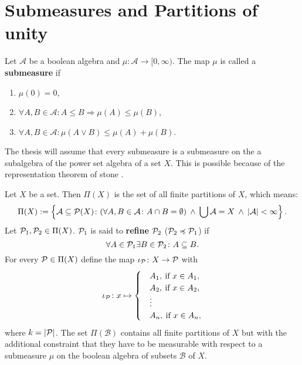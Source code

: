 \section{Submeasures and Partitions of unity}\label{appendixA}

\begin{defin}
  Let $\mathcal{A}$ be a boolean algebra and $\mu\colon \mathcal{A} \to [0, \infty)$. The map $\mu$ is called a \textbf{submeasure} if
  \begin{enumerate}
    \item $\mu(0) = 0$,
    \item $\forall A, B \in \mathcal{A}\colon A \leq B \Rightarrow \mu(A) \leq \mu(B)$,
    \item $\forall A, B \in \mathcal{A}\colon \mu(A \lor B) \leq \mu(A) + \mu(B)$.
  \end{enumerate}
\end{defin}

The thesis will assume that every submeasure is a submeasure on the a subalgebra of the power set algebra of a set $X$. This is possible because of the representation theorem of stone \cite{stone}.

\begin{defin}
  Let $X$ be a set. Then $\Pi(X)$ is the set of all finite partitions of $X$, which means:
  \begin{equation*}
    \Pi(X) := \left\{ \mathcal{A} \subseteq \P(X)\colon (\forall A,B \in \mathcal{A}\colon A \cap B = \emptyset) \: \land \: \bigcup\mathcal{A} = X \: \land \: \left| \mathcal{A} \right| < \infty \right\}.
  \end{equation*}
  Let $\P_1, \P_2 \in \Pi(X)$. $\P_1$ is said to \textbf{refine} $\P_2$ ($\P_2 \preccurlyeq \P_1$) if
  \begin{equation*}
    \forall A \in \P_1\exists B \in \P_2\colon A \subseteq B.
  \end{equation*}
  For every $\P \in \Pi(X)$ define the map $\iota_\P\colon X \to \P$ with
  \begin{equation*}
    \iota_\P\colon x \mapsto \begin{cases}
      &A_1, \: \text{if } x \in A_1, \\
      &A_2, \: \text{if } x \in A_2, \\
      &\vdots \\
      &A_n, \: \text{if } x \in A_n,
    \end{cases}
  \end{equation*}
  where $k = \left|\P\right|$.    
  The set $\Pi(\mathcal{B})$ contains all finite partitions of $X$ but with the additional constraint that they have to be measurable with respect to a submeasure $\mu$ on the boolean algebra of subsets $\mathcal{B}$ of $X$. 
\end{defin}

